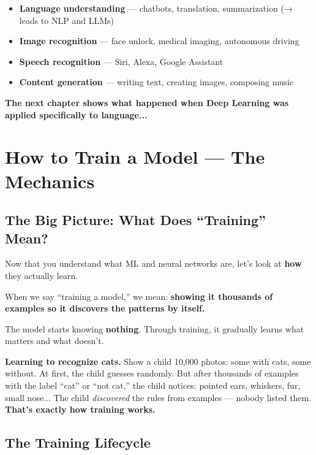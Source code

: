 \documentclass[11pt,a4paper]{report}
\begin{document}
\begin{itemize}
    \item \textbf{Language understanding} --- chatbots, translation, summarization (→ leads to NLP and LLMs)
    \item \textbf{Image recognition} --- face unlock, medical imaging, autonomous driving
    \item \textbf{Speech recognition} --- Siri, Alexa, Google Assistant
    \item \textbf{Content generation} --- writing text, creating images, composing music
\end{itemize}

\textbf{The next chapter shows what happened when Deep Learning was applied specifically to language...}

\chapter{How to Train a Model --- The Mechanics}

\section{The Big Picture: What Does ``Training'' Mean?}

Now that you understand what ML and neural networks are, let's look at \textbf{how} they actually learn.

When we say ``training a model,'' we mean: \textbf{showing it thousands of examples so it discovers the patterns by itself.}

The model starts knowing \textbf{nothing}. Through training, it gradually learns what matters and what doesn't.

\begin{analogybox}
\textbf{Learning to recognize cats.} Show a child 10,000 photos: some with cats, some without. At first, the child guesses randomly. But after thousands of examples with the label ``cat'' or ``not cat,'' the child notices: pointed ears, whiskers, fur, small nose... The child \textit{discovered} the rules from examples --- nobody listed them. \textbf{That's exactly how training works.}
\end{analogybox}

\section{The Training Lifecycle}
\end{document}
